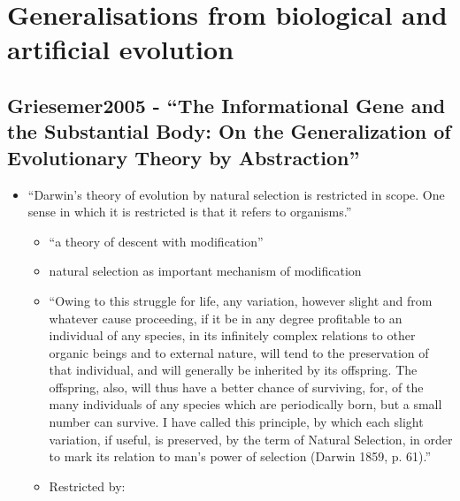 \section{Generalisations from biological and artificial evolution}
\hypertarget{griesemer2005---the-informational-gene-and-the-substantial-body-on-the-generalization-of-evolutionary-theory-by-abstraction}{\subsection{Griesemer2005
		- ``The Informational Gene and the Substantial Body: On the
		Generalization of Evolutionary Theory by
		Abstraction''}\label{griesemer2005---the-informational-gene-and-the-substantial-body-on-the-generalization-of-evolutionary-theory-by-abstraction}}

\begin{itemize}
	\item
	
	``Darwin's theory of evolution by natural selection is restricted in
	scope. One sense in which it is restricted is that it refers to
	organisms.''
	
	
	\begin{itemize}
		\item
		
		``a theory of descent with modification''
		
		\item
		
		natural selection as important mechanism of modification
		
		\item
		
		``Owing to this struggle for life, any variation, however slight and
		from whatever cause proceeding, if it be in any degree profitable to
		an individual of any species, in its infinitely complex relations to
		other organic beings and to external nature, will tend to the
		preservation of that individual, and will generally be inherited by
		its offspring. The offspring, also, will thus have a better chance
		of surviving, for, of the many individuals of any species which are
		periodically born, but a small number can survive. I have called
		this principle, by which each slight variation, if useful, is
		preserved, by the term of Natural Selection, in order to mark its
		relation to man's power of selection (Darwin 1859, p. 61).''
		
		\item
		
		Restricted by:
		

\end{itemize}
\end{itemize}
